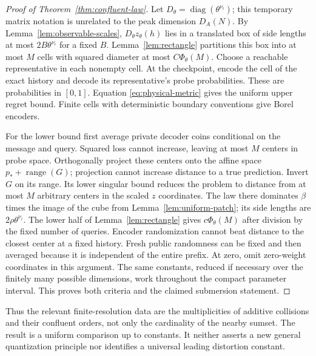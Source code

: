 \begin{proof}[Proof of Theorem~\ref{thm:confluent-law}]
Let $D_\theta=\operatorname{diag}(\theta^{\nu_i})$; this temporary
matrix notation is unrelated to the peak dimension $D_A(N)$.
By Lemma~\ref{lem:observable-scales}, $D_\theta z_\theta(h)$ lies in
a translated box of side lengths at most $2B\theta^{\nu_i}$ for a fixed
$B$. Lemma~\ref{lem:rectangle} partitions this box into at most $M$
cells with squared diameter at most $C\Phi_\theta(M)$. Choose a
reachable representative in each nonempty cell. At the checkpoint,
encode the cell of the exact history and decode its representative's
probe probabilities. These are probabilities in $[0,1]$. Equation
\eqref{eq:physical-metric} gives the uniform upper regret bound.
Finite cells with deterministic boundary conventions give Borel encoders.

For the lower bound first average private decoder coins conditional on
the message and query. Squared loss cannot increase, leaving at most
$M$ centers in probe space. Orthogonally project these centers onto the
affine space $p_*+\operatorname{range}(G)$; projection cannot increase
distance to a true prediction. Invert $G$ on its range. Its lower singular
bound reduces the problem to distance from at most $M$ arbitrary centers
in the scaled $z$ coordinates. The law there dominates $\beta$ times
the image of the cube from Lemma~\ref{lem:uniform-patch}; its side lengths
are $2\rho\theta^{\nu_i}$. The lower half of
Lemma~\ref{lem:rectangle} gives $c\Phi_\theta(M)$ after division by
the fixed number of queries. Encoder randomization cannot beat distance
to the closest center at a fixed history. Fresh public randomness can be
fixed and then averaged because it is independent of the entire prefix.
At zero, omit zero-weight coordinates in this argument. The same constants,
reduced if necessary over the finitely many possible dimensions, work
throughout the compact parameter interval. This proves both criteria and
the claimed submersion statement.
\end{proof}

Thus the relevant finite-resolution data are the multiplicities of additive
collisions and their confluent orders, not only the cardinality of the
nearby sumset. The result is a uniform comparison up to constants. It
neither asserts a new general quantization principle nor identifies a
universal leading distortion constant.
